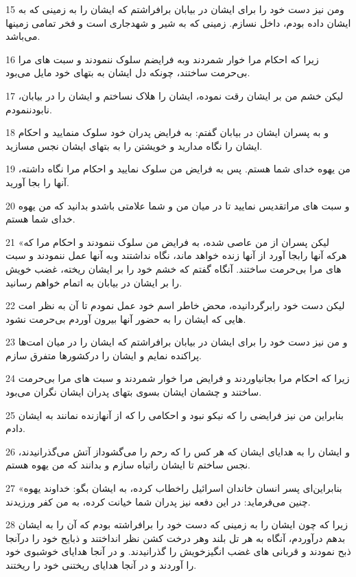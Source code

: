 \par 15 ومن نیز دست خود را برای ایشان در بیابان برافراشتم که ایشان را به زمینی که به ایشان داده بودم، داخل نسازم. زمینی که به شیر و شهدجاری است و فخر تمامی زمینها می‌باشد.
\par 16 زیرا که احکام مرا خوار شمردند وبه فرایضم سلوک ننمودند و سبت های مرا بی‌حرمت ساختند، چونکه دل ایشان به بتهای خود مایل می‌بود.
\par 17 لیکن خشم من بر ایشان رقت نموده، ایشان را هلاک نساختم و ایشان را در بیابان، نابودننمودم.
\par 18 و به پسران ایشان در بیابان گفتم: به فرایض پدران خود سلوک منمایید و احکام ایشان را نگاه مدارید و خویشتن را به بتهای ایشان نجس مسازید.
\par 19 من یهوه خدای شما هستم. پس به فرایض من سلوک نمایید و احکام مرا نگاه داشته، آنها را بجا آورید.
\par 20 و سبت های مراتقدیس نمایید تا در میان من و شما علامتی باشدو بدانید که من یهوه خدای شما هستم.
\par 21 «لیکن پسران از من عاصی شده، به فرایض من سلوک ننمودند و احکام مرا که هر‌که آنها رابجا آورد از آنها زنده خواهد ماند، نگاه نداشتند وبه آنها عمل ننمودند و سبت های مرا بی‌حرمت ساختند. آنگاه گفتم که خشم خود را بر ایشان ریخته، غضب خویش را بر ایشان در بیابان به اتمام خواهم رسانید.
\par 22 لیکن دست خود رابرگردانیده، محض خاطر اسم خود عمل نمودم تا آن به نظر امت هایی که ایشان را به حضور آنها بیرون آوردم بی‌حرمت نشود.
\par 23 و من نیز دست خود را برای ایشان در بیابان برافراشتم که ایشان را در میان امت‌ها پراکنده نمایم و ایشان را درکشورها متفرق سازم.
\par 24 زیرا که احکام مرا بجانیاوردند و فرایض مرا خوار شمردند و سبت های مرا بی‌حرمت ساختند و چشمان ایشان بسوی بتهای پدران ایشان نگران می‌بود.
\par 25 بنابراین من نیز فرایضی را که نیکو نبود و احکامی را که از آنهازنده نمانند به ایشان دادم.
\par 26 و ایشان را به هدایای ایشان که هر کس را که رحم را می‌گشوداز آتش می‌گذرانیدند، نجس ساختم تا ایشان راتباه سازم و بدانند که من یهوه هستم.
\par 27 «بنابراین‌ای پسر انسان خاندان اسرائیل راخطاب کرده، به ایشان بگو: خداوند یهوه چنین می‌فرماید: در این دفعه نیز پدران شما خیانت کرده، به من کفر ورزیدند.
\par 28 زیرا که چون ایشان را به زمینی که دست خود را برافراشته بودم که آن را به ایشان بدهم در‌آوردم، آنگاه به هر تل بلند وهر درخت کشن نظر انداختند و ذبایح خود را درآنجا ذبح نمودند و قربانی های غضب انگیزخویش را گذرانیدند. و در آنجا هدایای خوشبوی خود را آوردند و در آنجا هدایای ریختنی خود را ریختند.
